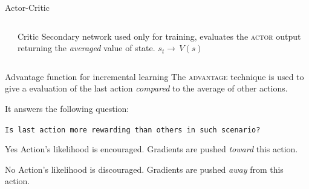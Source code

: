 \documentclass[aspectratio=169]{beamer}
\begin{document}
\begin{frame}{Actor-Critic}
\begin{columns}[T]
\begin{column}{0.1\textwidth}
		\end{column}
		\begin{column}{0.7\textwidth}
			\begin{alertblock}{Critic}
Secondary network used only for training, evaluates the \textsc{actor} output returning the \textit{averaged} value of state. $s_t\rightarrow\, V(s)$							\end{alertblock}
		\end{column}
	\end{columns}
	
\end{frame}

\begin{frame}{Advantage function for incremental learning}
	The \textsc{advantage} technique is used to give a  evaluation of the last action  \textit{compared} to the average of other actions.
\pause

It answers the following question:	

	\centering
	\texttt{Is last action more rewarding than others in such scenario?}
\pause
	\begin{alertblock}{Yes}
		\faThumbsUp\hspace{2pt} Action's likelihood is encouraged. Gradients are pushed \textit{toward} this action.
	\end{alertblock}
	\begin{alertblock}{No}
		\faThumbsDown\hspace{2pt} Action's likelihood is discouraged. Gradients are pushed \textit{away} from this action. 
	\end{alertblock}
\end{frame}
\end{document}
